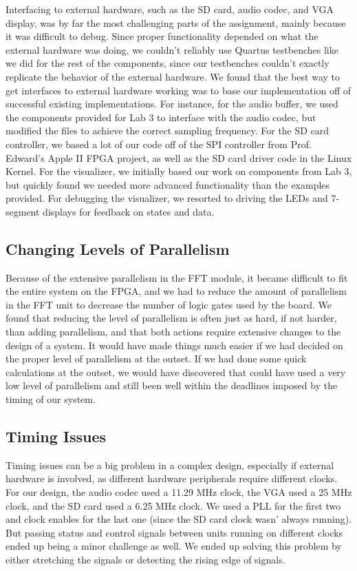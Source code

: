 \documentclass{article}
\begin{document}
Interfacing to external hardware, such as the SD card, audio codec, and VGA display, 
was by far the most challenging parts of the assignment, mainly because it was
difficult to debug. Since proper functionality depended on what the external hardware 
was doing, we couldn't reliably use Quartus testbenches like we did for the rest of the 
components, since our testbenches couldn't exactly replicate the behavior of the 
external hardware. We found that the best way to get interfaces to external hardware 
working was to base our implementation off of successful existing implementations. 
For instance, for the audio buffer, we used the components provided for Lab 3 to 
interface with the audio codec, but modified the files to achieve the correct sampling 
frequency. For the SD card controller, we based a lot of our code off of the SPI 
controller from Prof. Edward's Apple II FPGA project, as well as the SD card driver 
code in the Linux Kernel. For the visualizer, we initially based our work on 
components from Lab 3, but quickly found we needed more advanced functionality 
than the examples provided. For debugging the visualizer, we resorted to driving the 
LEDs and 7-segment displays for feedback on states and data.

\subsection{Changing Levels of Parallelism}

Because of the extensive parallelism in the FFT module, it became difficult to fit the 
entire system on the FPGA, and we had to reduce the amount of parallelism in the 
FFT unit to decrease the number of logic gates used by the board. We found that 
reducing the level of parallelism is often just as hard, if not harder, than adding 
parallelism, and that both actions require extensive changes to the design of a 
system. It would have made things much easier if we had decided on the proper level 
of parallelism at the outset. If we had done some quick calculations at the outset, we 
would have discovered that could have used a very low level of parallelism and still 
been well within the deadlines imposed by the timing of our system.

\subsection{Timing Issues}

Timing issues can be a big problem in a complex design, especially if external 
hardware is involved, as different hardware peripherals require different clocks. For 
our design, the audio codec used a 11.29 MHz clock, the VGA used a 25 MHz clock, 
and the SD card used a 6.25 MHz clock. We used a PLL for the first two and clock 
enables for the last one (since the SD card clock wasn' always running). But passing 
status and control signals between units running on different clocks ended up being a 
minor challenge as well. We ended up solving this problem by either stretching the 
signals or detecting the rising edge of signals. 
\end{document}

